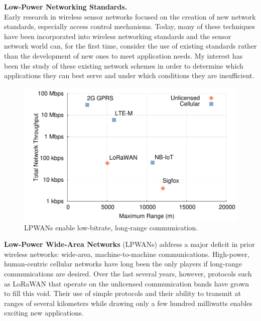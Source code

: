 \documentclass[11pt]{article} %
\begin{document}
\bigskip
\textbf{\textsf{\large Low-Power Networking Standards.}}\\
Early research in wireless sensor networks focused on the creation of new
network standards, especially access control mechanisms. Today, many of these
techniques have been incorporated into wireless networking standards and the
sensor network world can, for the first time, consider the use of existing
standards rather than the development of new ones to meet application needs. My
interest has been the study of these existing network schemes in order to
determine which applications they can best serve and under which conditions
they are insufficient.

\begin{figure}
  \vspace{-1.5em}
  \centering
  \includegraphics[width=0.49\columnwidth]{network-range-throughput}
  \caption*{\sffamily \scriptsize
   LPWANs enable low-bitrate, long-range communication.
  }
  \label{fig:lpwans}
  \vspace{-2em}
\end{figure}

\textbf{Low-Power Wide-Area Networks} (LPWANs) address a major deficit in prior
wireless networks: wide-area, machine-to-machine communications.
%
High-power, human-centric cellular networks
have long been the only players if
long-range communications are desired.
%
Over the last several years, however, protocols such as LoRaWAN that operate on
the unlicensed communication bands have grown to fill this void. Their use of
simple protocols and their ability to transmit at ranges of several kilometers
while drawing only a few hundred milliwatts enables exciting new applications.
\end{document}
